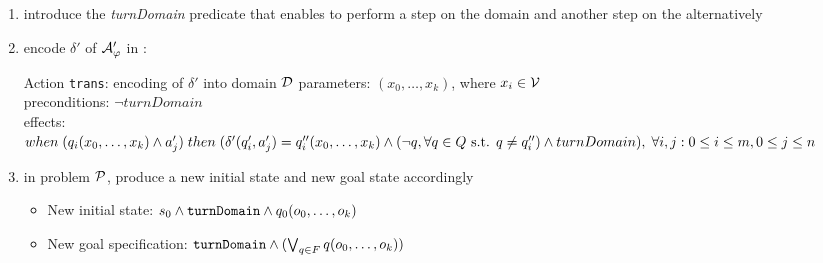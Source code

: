 \documentclass[10pt]{beamer}
\newcounter{saveenumi}
\newcommand{\conti}{\setcounter{enumi}{\value{saveenumi}}}
\begin{document}
\begin{frame}{}
%


\begin{enumerate}
\conti
\item introduce the \textit{turnDomain} predicate that enables to perform a step on the domain and another step on the \DFA alternatively
\item encode $\delta'$ of $\automaton'_\varphi$ in \PDDL:
\begin{block}{\normalsize Action \texttt{trans}: encoding of $\delta'$ into domain $\D$}
parameters: $(x_0, \dots, x_k)$, where $x_i \in \V$\\
preconditions: $\lnot turnDomain$\\
effects: $when\; (q_i(x_0, \dots, x_k) \lAND a'_j)\; then\; (\delta'(q'_i, a'_j)=q''_i(x_0, \dots, x_k) \lAND (\lnot q, \forall q \in Q \text{ s.t. } q \neq q''_i) \lAND turnDomain),\; \forall i,j: 0\leq i \leq m, 0\leq j \leq n$
\end{block}
\item in problem $\P$, produce a new initial state and new goal state accordingly
\begin{itemize}
\item New initial state: $s_0 \lAND \text{\texttt{turnDomain}} \lAND q_0(o_0,\dots,o_k)$
\item New goal specification: $\text{\texttt{turnDomain}} \lAND (\bigvee_{q \in F} q(o_0,\dots,o_k))$
\end{itemize}
\end{enumerate}
\end{frame}
\end{document}
